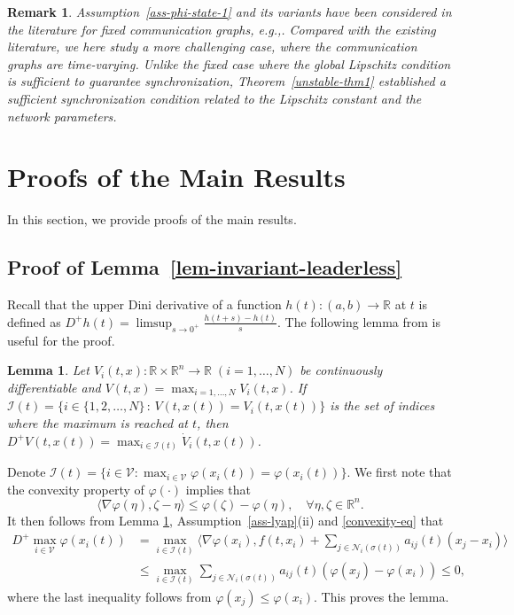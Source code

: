\documentclass[a4paper, 11pt]{article}
\newtheorem{lemma}{Lemma}
\newtheorem{remark}{Remark}
\def\R{\mathbb{R}}
\begin{document}
\begin{remark}\label{remark-unstable-ass}
Assumption~\ref{ass-phi-state-1} and its variants have been considered in the literature for fixed communication
graphs, e.g.,\cite{wu-chua,wu-book,belykh-belykh-hasler,delellis-circuit,liu-cao-wu,yu-chen-cao-tac2011,munz3}.
Compared with the existing literature, we here study a more challenging case, where the communication graphs are time-varying.
Unlike the fixed case where the global Lipschitz condition is sufficient to guarantee synchronization,
Theorem~\ref{unstable-thm1} established a sufficient synchronization condition related to the Lipschitz constant and the network parameters.
\end{remark}



\section{Proofs of the Main Results}\label{sec-proofs}
In this section, we provide proofs of the main results.
\subsection{Proof of Lemma~\ref{lem-invariant-leaderless}}\label{proof-lem-invariant-leaderless}
Recall that the upper Dini derivative of a function $h(t): (a,b)\to {\R}$ at $t$ is defined as $D^+h(t)=\limsup_{s\to 0^+} \frac{h(t+s)-h(t)}{s}$. The following lemma from \cite{dan,lin07} is useful for the proof.
\begin{lemma}\label{lem1}
Let $V_i(t,x): {\R}\times {\R}^n \to \R \;(i=1,\dots,N)$ be
continuously differentiable and $V(t,x)=\max_{i=1,\dots,N}V_i(t,x)$. If $
\mathcal{I}(t)=\{i\in \{1,2,\dots,N\}\,:\,V(t,x(t))=V_i(t,x(t))\}$
is the set of indices where the maximum is reached at $t$, then $D^+V(t,x(t))=\max_{i\in\mathcal{I}(t)}\dot{V}_i(t,x(t))$.
\end{lemma}
Denote $\mathcal{I}(t)=\{i \in \mathcal{V}: \max_{i \in \mathcal{V}} \varphi(x_i(t))=\varphi(x_i(t))\}$.
We first note that the convexity property of $\varphi(\cdot)$ implies that \cite[pp.69]{boyd-vandenberghe}
\begin{equation}\label{convexity-eq}
\langle \nabla \varphi(\eta), \zeta-\eta \rangle \leq \varphi(\zeta)-\varphi(\eta), \quad \forall \eta,\zeta \in {\R}^n.
\end{equation}
It then follows from Lemma \ref{lem1}, Assumption~\ref{ass-lyap}(ii) and \eqref{convexity-eq} that
\begin{align*}
D^+ \max_{i \in \mathcal{V}} \varphi(x_i(t))&= \max_{i \in \mathcal{I}(t)} \big \langle \nabla \varphi(x_i), f(t,x_i)+\sum _{j \in \mathcal{N}_i(\sigma(t))} a_{ij}(t)(x_j-x_i) \big \rangle \\
& \leq \max_{i \in \mathcal{I}(t)} \sum _{j \in \mathcal{N}_i(\sigma(t))}a_{ij}(t)(\varphi(x_j)-\varphi(x_i)) \leq 0,
\end{align*}
where the last inequality follows from $\varphi(x_j) \leq \varphi(x_i)$. This proves the lemma.
\end{document}
